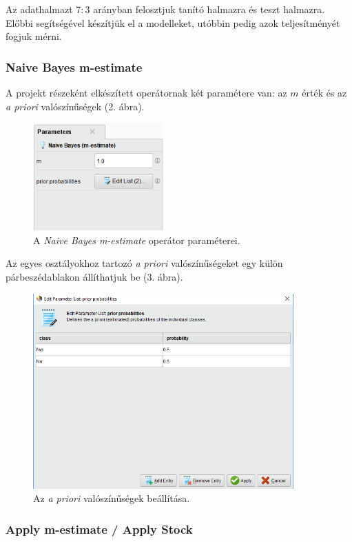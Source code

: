 \documentclass[a4paper]{article}
\begin{document}
Az adathalmazt $7:3$ arányban felosztjuk tanító halmazra és teszt halmazra. Előbbi segítségével készítjük el a modelleket, utóbbin pedig azok teljesítményét fogjuk mérni.

\subsubsection{Naive Bayes m-estimate}

A projekt részeként elkészített operátornak két paramétere van: az $m$ érték és az \textit{a priori} valószínűségek (2. ábra).

\begin{figure}[h]
    \centering
    \includegraphics[width=5cm]{parameters}
    \caption{A \textit{Naive Bayes m-estimate} operátor paraméterei.}
\end{figure}

Az egyes osztályokhoz tartozó \textit{a priori} valószínűségeket egy külön párbeszédablakon állíthatjuk be (3. ábra).

\begin{figure}[h]
    \centering
    \includegraphics[width=10cm]{priors}
    \caption{Az \textit{a priori} valószínűségek beállítása.}
\end{figure}

\subsubsection{Apply m-estimate / Apply Stock}
\end{document}
